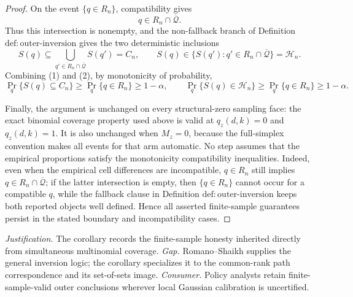 \documentclass{article}
\begin{document}
\begin{proof}
On the event \(\{q\in R_n\}\), compatibility gives
\[
q\in R_n\cap\overline{\mathcal Q}.
\]
Thus this intersection is nonempty, and the non-fallback branch of Definition \(\mathrm{def:outer\text{-}inversion}\) gives the two deterministic inclusions
\[
S(q)\subseteq
 \bigcup_{q'\in R_n\cap\overline{\mathcal Q}}S(q')=C_n,
\qquad
S(q)\in
 \{S(q'):q'\in R_n\cap\overline{\mathcal Q}\}=\mathcal H_n. \tag{2}
\]
Combining (1) and (2), by monotonicity of probability,
\[
\Pr_q\{S(q)\subseteq C_n\}
 \ge\Pr_q\{q\in R_n\}\ge1-\alpha,
\qquad
\Pr_q\{S(q)\in\mathcal H_n\}
 \ge\Pr_q\{q\in R_n\}\ge1-\alpha.
\]

Finally, the argument is unchanged on every structural-zero sampling face: the exact binomial coverage property used above is valid at \(q_z(d,k)=0\) and \(q_z(d,k)=1\).  It is also unchanged when \(M_z=0\), because the full-simplex convention makes all events for that arm automatic.  No step assumes that the empirical proportions satisfy the monotonicity compatibility inequalities.  Indeed, even when the empirical cell differences are incompatible, \(q\in R_n\) still implies \(q\in R_n\cap\overline{\mathcal Q}\); if the latter intersection is empty, then \(\{q\in R_n\}\) cannot occur for a compatible \(q\), while the fallback clause in Definition \(\mathrm{def:outer\text{-}inversion}\) keeps both reported objects well defined.  Hence all asserted finite-sample guarantees persist in the stated boundary and incompatibility cases.
\end{proof}
\par\smallskip\noindent \textit{Justification.} The corollary records the finite-sample honesty inherited directly from simultaneous multinomial coverage. \textit{Gap.} Romano--Shaikh supplies the general inversion logic; the corollary specializes it to the common-rank path correspondence and its set-of-sets image. \textit{Consumer.} Policy analysts retain finite-sample-valid outer conclusions wherever local Gaussian calibration is uncertified.
\end{document}
